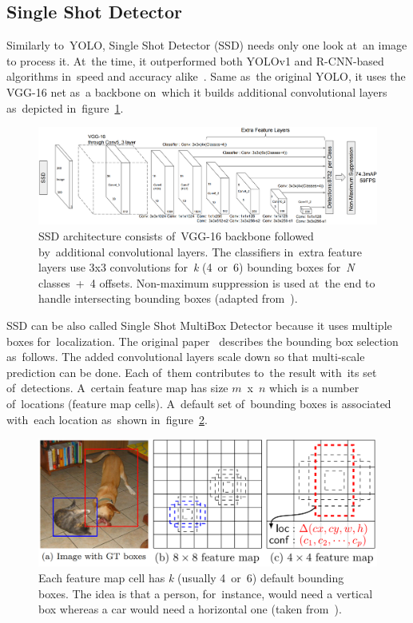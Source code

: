\subsection{Single Shot Detector}
\label{algorithms-nn-ssd}
Similarly to~YOLO, Single Shot Detector (SSD) needs only one look at~an image to process it. At~the time, it outperformed both YOLOv1 and R-CNN-based algorithms in~speed and accuracy alike~\cite{ssd-paper}. Same as~the original YOLO, it uses the VGG-16 net as~a backbone on~which it builds additional convolutional layers as~depicted in~figure~\ref{ssd-architecture}.

\begin{figure}[hbt]
    \includegraphics[width=1\textwidth]{img/algorithms/ssd-architecture.png}
    \caption{SSD architecture consists of~VGG-16 backbone followed by~additional convolutional layers. The classifiers in~extra feature layers use 3x3 convolutions for~\emph{k} (4~or~6) bounding boxes for~\emph{N} classes~+~4 offsets. Non-maximum suppression is used at~the end to handle intersecting bounding boxes (adapted from~\cite{ssd-paper}).}
    \label{ssd-architecture}
\end{figure}

SSD can be also called Single Shot MultiBox Detector because it uses multiple boxes for~localization. The original paper~\cite{ssd-paper} describes the bounding box selection as~follows. The added convolutional layers scale down so that multi-scale prediction can be done. Each of~them contributes to~the result with~its set of~detections. A~certain feature map has size \(m\)~x~\(n\) which is a number of~locations (feature map cells). A~default set of~bounding boxes is associated with~each location as~shown in~figure~\ref{ssd-multibox}.

\begin{figure}[hbt]
    \includegraphics[width=1\textwidth]{img/algorithms/ssd-multibox.png}
    \caption{Each feature map cell has \emph{k} (usually 4~or~6) default bounding boxes. The idea is that a person, for~instance, would need a vertical box whereas a car would need a horizontal one (taken from~\cite{ssd-paper}).}    
    \label{ssd-multibox}
\end{figure}

